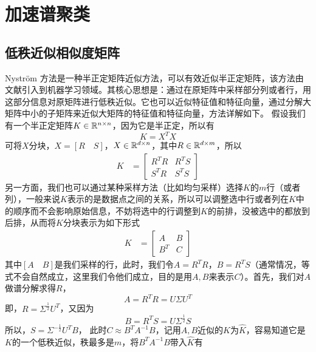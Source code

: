 \section{加速谱聚类}
\subsection{低秩近似相似度矩阵}
Nyström 方法是一种半正定矩阵近似方法，可以有效近似半正定矩阵，该方法由文献\cite{williams2001using}引入到机器学习领域。其核心思想是：通过在原矩阵中采样部分列或者行，用这部分信息对原矩阵进行低秩近似。它也可以近似特征值和特征向量，通过分解大矩阵中小的子矩阵来近似大矩阵的特征值和特征向量，方法详解如下。
假设我们有一个半正定矩阵$K \in \mathbb{R}^{n \times n}$，因为它是半正定，所以有
\begin{equation*}
    K = X^T X
\end{equation*}
可将$X$分块，$X=[R\quad S]$，$X \in \mathbb{R}^{d\times n}$，其中$R \in \mathbb{R}^{d\times m}$，所以
\begin{align*}
    K & = \begin{bmatrix}
            R^T R & R^T S \\
            S^T R & S^T S 
          \end{bmatrix} 
\end{align*}
另一方面，我们也可以通过某种采样方法（比如均匀采样）选择$K$的$m$行（或者列），一般来说$K$表示的是数据点之间的关系，所以可以调整选中行或者列在$K$中的顺序而不会影响原始信息，不妨将选中的行调整到$K$的前排，没被选中的都放到后排，从而将$K$分块表示为如下形式
\begin{align*}
    K & = \begin{bmatrix}
            A & B \\
            B^T & C
          \end{bmatrix} 
\end{align*}
其中$[A \quad B]$是我们采样的行，此时，我们令$A = R^T R$，$B = R^T S$（通常情况，等式不会自然成立，这里我们令他们成立，目的是用$A,B$来表示$C$）。首先，我们对$A$做谱分解求得$R$，
\begin{equation*}
    A = R^T R = U\Sigma U^T
\end{equation*}
即，$R = \Sigma^{\frac{1}{2}}U^T$，又因为
\begin{equation*}
    B = R^T S = U\Sigma^{\frac{1}{2}}S
\end{equation*}
所以，$S = \Sigma^{-\frac{1}{2}}U^T B$，
此时$C \approx B^T A^{-1} B$，记用$A,B$近似的$K$为$\hat{K}$，容易知道它是$K$的一个低秩近似，秩最多是$m$，将$B^T A^{-1} B$带入$\hat{K}$有
